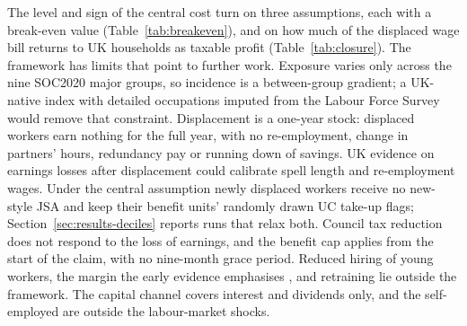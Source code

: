 The level and sign of the central cost turn on three assumptions, each with a break-even value (Table~\ref{tab:breakeven}), and on how much of the displaced wage bill returns to UK households as taxable profit (Table~\ref{tab:closure}). The framework has limits that point to further work. Exposure varies only across the nine SOC2020 major groups, so incidence is a between-group gradient; a UK-native index \citep{henseke2025} with detailed occupations imputed from the Labour Force Survey would remove that constraint. Displacement is a one-year stock: displaced workers earn nothing for the full year, with no re-employment, change in partners' hours, redundancy pay or running down of savings. UK evidence on earnings losses after displacement \citep{upward2019} could calibrate spell length and re-employment wages. Under the central assumption newly displaced workers receive no new-style JSA and keep their benefit units' randomly drawn UC take-up flags; Section~\ref{sec:results-deciles} reports runs that relax both. Council tax reduction does not respond to the loss of earnings, and the benefit cap applies from the start of the claim, with no nine-month grace period. Reduced hiring of young workers, the margin the early evidence emphasises \citep{brynjolfsson2025, kleinteeselink2025, hosseini2026}, and retraining \citep{hyman2025} lie outside the framework. The capital channel covers interest and dividends only, and the self-employed are outside the labour-market shocks.
